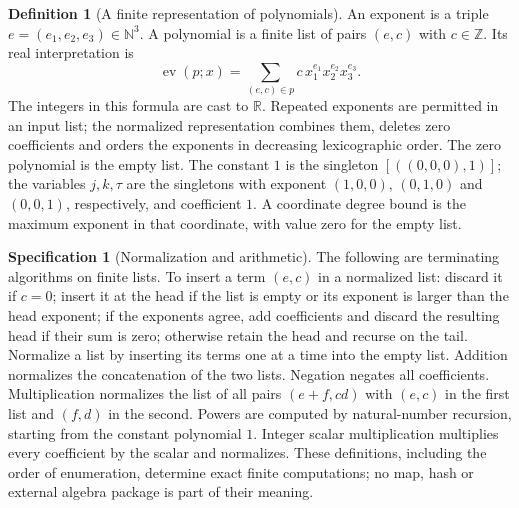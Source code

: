 \documentclass[11pt,a4paper]{article}
\theoremstyle{definition}
\newtheorem{definition}{Definition}[section]
\newtheorem{specification}{Specification}[section]
\newcommand{\E}[2]{\refstepcounter{equation}\[#2\tag{\theequation}\label{eq:#1}\]}
\newcommand{\R}{\mathbb R}
\newcommand{\Zz}{\mathbb Z}
\newcommand{\N}{\mathbb N}
\DeclareMathOperator{\ev}{ev}
\begin{document}
\begin{definition}[A finite representation of polynomials]\label{def:poly}
An exponent is a triple $e=(e_1,e_2,e_3)\in\N^3$. A polynomial is a finite list of pairs $(e,c)$ with $c\in\Zz$. Its real interpretation is
\E{polyeval}{\ev(p;x)=\sum_{(e,c)\in p}c\,x_1^{e_1}x_2^{e_2}x_3^{e_3}.}
The integers in this formula are cast to $\R$. Repeated exponents are permitted in an input list; the normalized representation combines them, deletes zero coefficients and orders the exponents in decreasing lexicographic order. The zero polynomial is the empty list. The constant $1$ is the singleton $[((0,0,0),1)]$; the variables $j,k,\tau$ are the singletons with exponent $(1,0,0)$, $(0,1,0)$ and $(0,0,1)$, respectively, and coefficient $1$. A coordinate degree bound is the maximum exponent in that coordinate, with value zero for the empty list.
\end{definition}

\begin{specification}[Normalization and arithmetic]\label{spec:polyops}
The following are terminating algorithms on finite lists.
To insert a term $(e,c)$ in a normalized list: discard it if $c=0$; insert it at the head if the list is empty or its exponent is larger than the head exponent; if the exponents agree, add coefficients and discard the resulting head if their sum is zero; otherwise retain the head and recurse on the tail. Normalize a list by inserting its terms one at a time into the empty list.
Addition normalizes the concatenation of the two lists. Negation negates all coefficients. Multiplication normalizes the list of all pairs $(e+f,cd)$ with $(e,c)$ in the first list and $(f,d)$ in the second. Powers are computed by natural-number recursion, starting from the constant polynomial $1$. Integer scalar multiplication multiplies every coefficient by the scalar and normalizes.
These definitions, including the order of enumeration, determine exact finite computations; no map, hash or external algebra package is part of their meaning.
\end{specification}
\end{document}
